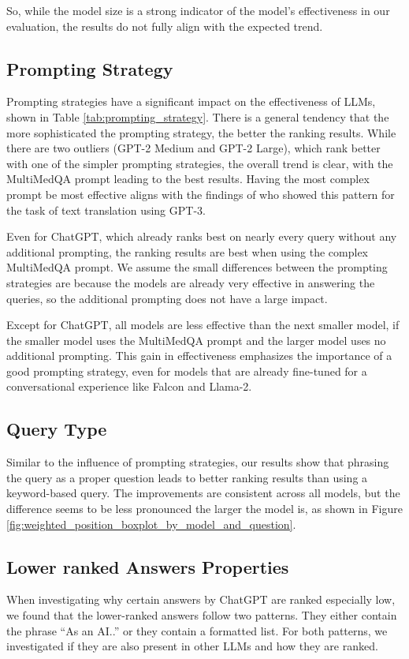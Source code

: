 So, while the model size is a strong indicator of the model's effectiveness in our evaluation, the results do not fully align with the expected trend.

\subsection{Prompting Strategy}
Prompting strategies have a significant impact on the effectiveness of LLMs, shown in Table \ref{tab:prompting_strategy}.
There is a general tendency that the more sophisticated the prompting strategy, the better the ranking results.
While there are two outliers (GPT-2 Medium and GPT-2 Large), which rank better with one of the simpler prompting strategies, the overall trend is clear, with the MultiMedQA prompt leading to the best results.
Having the most complex prompt be most effective aligns with the findings of \cite{reynolds:2021:Prompt} who showed this pattern for the task of text translation using GPT-3.

Even for ChatGPT, which already ranks best on nearly every query without any additional prompting, the ranking results are best when using the complex MultiMedQA prompt.
We assume the small differences between the prompting strategies are because the models are already very effective in answering the queries, so the additional prompting does not have a large impact.

Except for ChatGPT, all models are less effective than the next smaller model, if the smaller model uses the MultiMedQA prompt and the larger model uses no additional prompting.
This gain in effectiveness emphasizes the importance of a good prompting strategy, even for models that are already fine-tuned for a conversational experience like Falcon and Llama-2.

\subsection{Query Type}
Similar to the influence of prompting strategies, our results show that phrasing the query as a proper question leads to better ranking results than using a keyword-based query.
The improvements are consistent across all models, but the difference seems to be less pronounced the larger the model is, as shown in Figure \ref{fig:weighted_position_boxplot_by_model_and_question}.

\subsection{Lower ranked Answers Properties}
When investigating why certain answers by ChatGPT are ranked especially low, we found that the lower-ranked answers follow two patterns.
They either contain the phrase ``As an AI..'' or they contain a formatted list.
For both patterns, we investigated if they are also present in other LLMs and how they are ranked.

